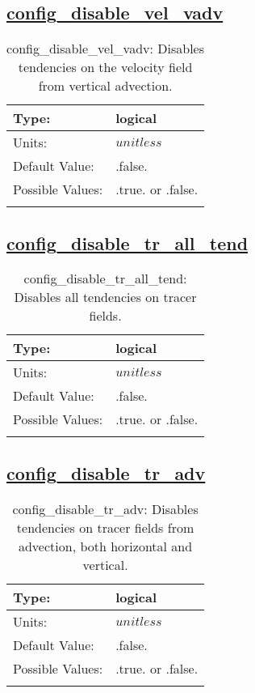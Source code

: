 \subsection[config\_disable\_vel\_vadv]{\hyperref[sec:nm_tab_debug]{config\_disable\_vel\_vadv}}
\label{subsec:nm_sec_config_disable_vel_vadv}
\begin{center}
\begin{longtable}{| p{2.0in} | p{4.0in} |}
    \hline
    Type: & logical \\
    \hline
    Units: & $unitless$ \\
    \hline
    Default Value: & .false. \\
    \hline
    Possible Values: & .true. or .false. \\
    \hline
    \caption{config\_disable\_vel\_vadv: Disables tendencies on the velocity field from vertical advection.}
\end{longtable}
\end{center}
\subsection[config\_disable\_tr\_all\_tend]{\hyperref[sec:nm_tab_debug]{config\_disable\_tr\_all\_tend}}
\label{subsec:nm_sec_config_disable_tr_all_tend}
\begin{center}
\begin{longtable}{| p{2.0in} | p{4.0in} |}
    \hline
    Type: & logical \\
    \hline
    Units: & $unitless$ \\
    \hline
    Default Value: & .false. \\
    \hline
    Possible Values: & .true. or .false. \\
    \hline
    \caption{config\_disable\_tr\_all\_tend: Disables all tendencies on tracer fields.}
\end{longtable}
\end{center}
\subsection[config\_disable\_tr\_adv]{\hyperref[sec:nm_tab_debug]{config\_disable\_tr\_adv}}
\label{subsec:nm_sec_config_disable_tr_adv}
\begin{center}
\begin{longtable}{| p{2.0in} | p{4.0in} |}
    \hline
    Type: & logical \\
    \hline
    Units: & $unitless$ \\
    \hline
    Default Value: & .false. \\
    \hline
    Possible Values: & .true. or .false. \\
    \hline
    \caption{config\_disable\_tr\_adv: Disables tendencies on tracer fields from advection, both horizontal and vertical.}
\end{longtable}
\end{center}
